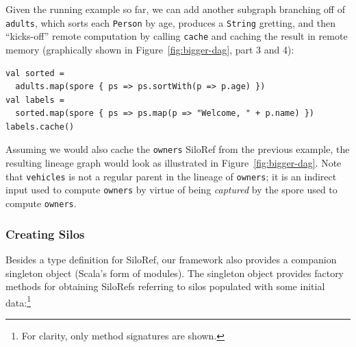 \documentclass[10pt]{sigplanconf}
\theoremstyle{definition}
\theoremstyle{definition}
\begin{document}
Given the running example so far, we can add another subgraph branching off of
\verb|adults|, which sorts each \verb|Person| by age, produces a \verb|String|
gretting, and then ``kicks-off'' remote computation by calling \verb|cache| and
caching the result in remote memory (graphically shown in
Figure~\ref{fig:bigger-dag}, part 3 and 4):

\begin{lstlisting}
val sorted =
  adults.map(spore { ps => ps.sortWith(p => p.age) })
val labels =
  sorted.map(spore { ps => ps.map(p => "Welcome, " + p.name) })
labels.cache()
\end{lstlisting}
\noindent
Assuming we would also cache the \verb|owners| SiloRef from the previous
example, the resulting lineage graph would look as illustrated in
Figure~\ref{fig:bigger-dag}. Note that \verb|vehicles|
is not a regular parent in the lineage of \verb|owners|; it is an indirect
input used to compute \verb|owners| by virtue of being {\em captured} by the
spore used to compute \verb|owners|.



%

\subsubsection{Creating Silos}
\label{sec:creating-silos}

Besides a type definition for SiloRef, our framework also provides a companion
singleton object (Scala's form of modules). The singleton object provides
factory methods for obtaining SiloRefs referring to silos populated with some
initial data:\footnote{For clarity, only method signatures are shown.}
\end{document}
